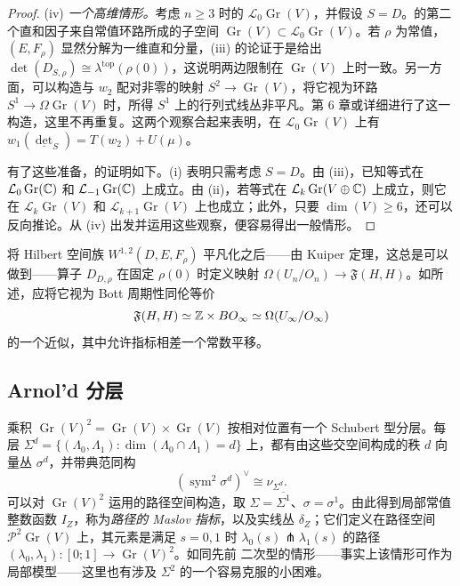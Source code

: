 \begin{proof}
\noindent(iv) \emph{一个高维情形。}考虑 $n\geq3$ 时的 $\mathcal L_0\operatorname{Gr}(V)$，并假设 $S=D$。的第二个直和因子来自常值环路所成的子空间 $\operatorname{Gr}(V)\subset\mathcal L_0\operatorname{Gr}(V)$。若 $\rho$ 为常值，$(E,\allowbreak F_\rho)$ 显然分解为一维直和分量，(iii) 的论证于是给出 $\det(D_{S,\allowbreak \rho})\cong\lambda^{\mathrm{top}}(\rho(0))$，这说明两边限制在 $\operatorname{Gr}(V)$ 上时一致。另一方面，可以构造与 $w_2$ 配对非零的映射 $S^2\to\operatorname{Gr}(V)$，将它视为环路 $S^1\to\Omega\operatorname{Gr}(V)$ 时，所得 $S^1$ 上的行列式线丛非平凡。第 6 章或详细进行了这一构造，这里不再重复。这两个观察合起来表明，在 $\mathcal L_0\operatorname{Gr}(V)$ 上有 $w_1(\underline{\det}_S)=T(w_2)+U(\mu)$。

有了这些准备，的证明如下。(i) 表明只需考虑 $S=D$。由 (iii)，已知等式在 $\mathcal L_0\operatorname{Gr}(\mathbb C)$ 和 $\mathcal L_{-1}\operatorname{Gr}(\mathbb C)$ 上成立。由 (ii)，若等式在 $\mathcal L_k\operatorname{Gr}(V\oplus\mathbb C)$ 上成立，则它在 $\mathcal L_k\operatorname{Gr}(V)$ 和 $\mathcal L_{k+1}\operatorname{Gr}(V)$ 上也成立；此外，只要 $\dim(V)\geq6$，还可以反向推论。从 (iv) 出发并运用这些观察，便容易得出一般情形。
\end{proof}
\begin{note}\label{st:11.8}
将 Hilbert 空间族 $W^{1,\allowbreak 2}(D,\allowbreak E,\allowbreak F_\rho)$ 平凡化之后——由 Kuiper 定理，这总是可以做到——算子 $D_{D,\allowbreak \rho}$ 在固定 $\rho(0)$ 时定义映射 $\Omega(U_n/O_n)\to\mathfrak F(H,\allowbreak H)$。如所述，应将它视为 Bott 周期性同伦等价
\[
\mathfrak F(H,H)\simeq\mathbb Z\times BO_\infty\simeq\Omega(U_\infty/O_\infty)
\]
的一个近似，其中允许指标相差一个常数平移。
\end{note}

\clearpage
\subsection{Arnol’d 分层}\label{sec:11f}
乘积 $\operatorname{Gr}(V)^2=\operatorname{Gr}(V)\times\operatorname{Gr}(V)$ 按相对位置有一个 Schubert 型分层。每层 $\Sigma^d=\{(\Lambda_0,\allowbreak \Lambda_1):\dim(\Lambda_0\cap\Lambda_1)=d\}$ 上，都有由这些交空间构成的秩 $d$ 向量丛 $\sigma^d$，并带典范同构
\begin{equation}\label{eq:11.17}
(\operatorname{sym}^2\sigma^d)^\vee\cong\nu_{\Sigma^d}.
\end{equation}
可以对 $\operatorname{Gr}(V)^2$ 运用的路径空间构造，取 $\Sigma=\overline{\Sigma^1}$、$\sigma=\sigma^1$。由此得到局部常值整数函数 $I_Z$，称为\emph{路径的 Maslov 指标}，以及实线丛 $\delta_Z$；它们定义在路径空间 $\mathcal P^2\operatorname{Gr}(V)$ 上，其元素是满足 $s=0,\allowbreak 1$ 时 $\lambda_0(s)\pitchfork\lambda_1(s)$ 的路径 $(\lambda_0,\allowbreak \lambda_1):[0;1]\to\operatorname{Gr}(V)^2$。如同先前
二次型的情形——事实上该情形可作为局部模型——这里也有涉及 $\Sigma^2$ 的一个容易克服的小困难。

